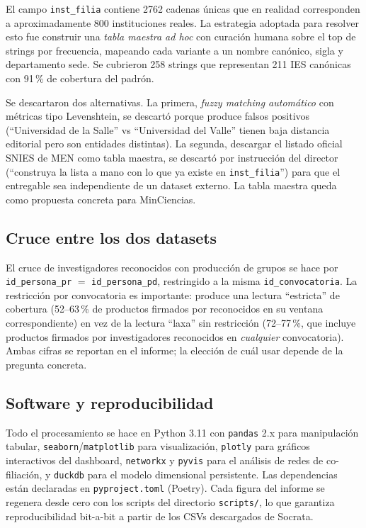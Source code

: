 \documentclass[11pt,a4paper,oneside]{article}
\begin{document}
El campo \texttt{inst\_filia} contiene \num{2762} cadenas únicas que en realidad corresponden a aproximadamente 800 instituciones reales. La estrategia adoptada para resolver esto fue construir una \emph{tabla maestra ad hoc} con curación humana sobre el top de strings por frecuencia, mapeando cada variante a un nombre canónico, sigla y departamento sede. Se cubrieron 258 strings que representan 211 IES canónicas con 91\,\% de cobertura del padrón.

Se descartaron dos alternativas. La primera, \emph{fuzzy matching automático} con métricas tipo Levenshtein, se descartó porque produce falsos positivos (``Universidad de la Salle'' vs ``Universidad del Valle'' tienen baja distancia editorial pero son entidades distintas). La segunda, descargar el listado oficial SNIES de MEN como tabla maestra, se descartó por instrucción del director (``construya la lista a mano con lo que ya existe en \texttt{inst\_filia}'') para que el entregable sea independiente de un dataset externo. La tabla maestra queda como propuesta concreta para MinCiencias.

\subsection{Cruce entre los dos datasets}

El cruce de investigadores reconocidos con producción de grupos se hace por \texttt{id\_persona\_pr} $=$ \texttt{id\_persona\_pd}, restringido a la misma \texttt{id\_convocatoria}. La restricción por convocatoria es importante: produce una lectura ``estricta'' de cobertura (52--63\,\% de productos firmados por reconocidos en su ventana correspondiente) en vez de la lectura ``laxa'' sin restricción (72--77\,\%, que incluye productos firmados por investigadores reconocidos en \emph{cualquier} convocatoria). Ambas cifras se reportan en el informe; la elección de cuál usar depende de la pregunta concreta.

\subsection{Software y reproducibilidad}

Todo el procesamiento se hace en Python 3.11 con \texttt{pandas} 2.x para manipulación tabular, \texttt{seaborn}/\texttt{matplotlib} para visualización, \texttt{plotly} para gráficos interactivos del dashboard, \texttt{networkx} y \texttt{pyvis} para el análisis de redes de co-filiación, y \texttt{duckdb} para el modelo dimensional persistente. Las dependencias están declaradas en \texttt{pyproject.toml} (Poetry). Cada figura del informe se regenera desde cero con los scripts del directorio \texttt{scripts/}, lo que garantiza reproducibilidad bit-a-bit a partir de los CSVs descargados de Socrata.
\end{document}
